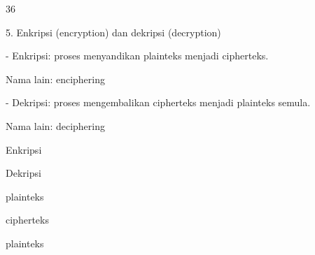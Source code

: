 \documentclass{article}
\begin{document}

36

5. Enkripsi (encryption) dan dekripsi (decryption)

        - Enkripsi: proses menyandikan plainteks menjadi cipherteks. 

          Nama lain: enciphering

       - Dekripsi: proses mengembalikan cipherteks menjadi plainteks semula.

           Nama lain: deciphering

Enkripsi

Dekripsi

plainteks

cipherteks

plainteks
\end{document}
